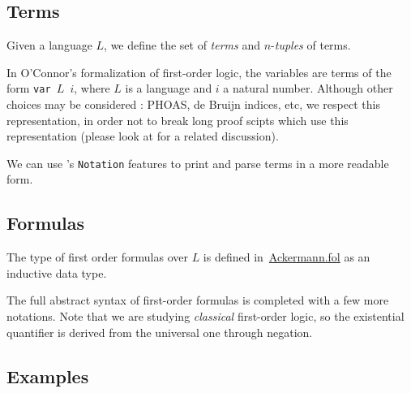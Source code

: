 \subsection{Terms}

Given a language $L$, we define the set of \emph{terms} and
$n$-\emph{tuples} of terms. 







\begin{remark}[Variables]
In O'Connor's formalization of first-order logic, the variables are \gallina terms of the form \texttt{var $L$ $i$}, where $L$ is
 a language and $i$ a natural number. 
Although other choices may be considered : PHOAS, de Bruijn indices, etc,  we   respect this representation, in order not to break long proof scipts which use this representation (please look at \cite{OConnor05} for a related discussion).
  
\end{remark}

\begin{remark}
 We can use \coq's \texttt{Notation} features to print and parse terms in a more readable form.




\end{remark}


\subsection{Formulas}



The type of first order formulas over $L$ is defined 
in~\href{../theories/html/hydras.Ackermann.fol.html}{Ackermann.fol} as an inductive data type.


The full abstract syntax of first-order formulas is completed 
with a few more notations. Note that we are studying \emph{classical} first-order logic, so the existential quantifier is derived from the universal one through negation. 


\subsection{Examples}




